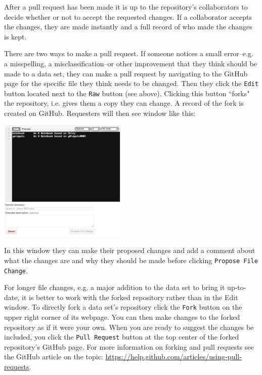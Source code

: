 \documentclass[twocolumn]{article}\usepackage{graphicx, color}
\begin{document}
After a pull request has been made it is up to the repository's collaborators to decide whether or not to accept the requested changes. If a collaborator accepts the changes, they are made instantly and a full record of who made the changes is kept.

There are two ways to make a pull request. If someone notices a small error--e.g. a misspelling, a misclassification--or other improvement that they think should be made to a data set, they can make a pull request by navigating to the GitHub page for the specific file they think needs to be changed. Then they click the \texttt{Edit} button located next to the \texttt{Raw} button (see above). Clicking this button ``forks" the repository, i.e. gives them a copy they can change. A record of the fork is created on GitHub. Requesters will then see  window like this:

\begin{center}
	\includegraphics[width=0.46\textwidth]{images/PullRequest.png}
\end{center}

\noindent In this window they can make their proposed changes and add a comment about what the changes are and why they should be made before clicking \texttt{Propose File Change}.

For longer file changes, e.g. a major addition to the data set to bring it up-to-date, it is better to work with the forked repository rather than in the Edit window. To directly fork a data set's repository click the \texttt{Fork} button on the upper right corner of its webpage. You can then make changes to the forked repository as if it were your own. When you are ready to suggest the changes be included, you click the \texttt{Pull Request} button at the top center of the forked repository's GitHub page. For more information on forking and pull requests see the GitHub article on the topic: \url{https://help.github.com/articles/using-pull-requests}.
\end{document}
